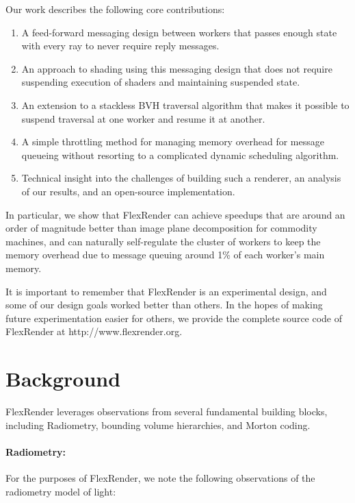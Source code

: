 \documentclass[a4paper,twoside]{article}
\begin{document}
Our work describes the following core contributions:

\begin{enumerate}
    \item A feed-forward messaging design between workers that passes enough
        state with every ray to never require reply messages.
    \item An approach to shading using this messaging design that does not
        require suspending execution of shaders and maintaining suspended state.
    \item An extension to a stackless BVH traversal algorithm \cite{hapala:2011}
        that makes it possible to suspend traversal at one worker and resume it
        at another.
    \item A simple throttling method for managing memory overhead for message
        queueing without resorting to a complicated dynamic scheduling algorithm.
    \item Technical insight into the challenges of building such a renderer, an
        analysis of our results, and an open-source implementation.
\end{enumerate}

In particular, we show that FlexRender can achieve speedups that are around an
order of magnitude better than image plane decomposition for commodity machines,
and can naturally self-regulate the cluster of workers to keep the memory
overhead due to message queuing around 1\% of each worker's main memory.

It is important to remember that FlexRender is an experimental 
design, and some of our design goals worked better than others. In the hopes of
making future experimentation easier for others, we provide the complete
source code of FlexRender at http://www.flexrender.org.

\section{Background}
\label{background}

FlexRender leverages observations from several fundamental building blocks,
including Radiometry, bounding volume hierarchies, and Morton coding.

\paragraph{Radiometry:}
For the purposes of FlexRender, we note the following observations of the
radiometry model of light:
\end{document}
